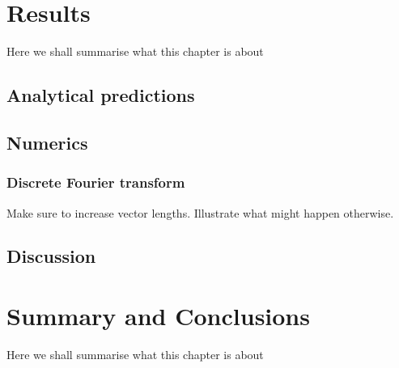 \documentclass[12pt]{report}
\newcommand{\todo}[1]{{\leavevmode\color{todo}#1}}
\begin{document}
\chapter{Results}
\todo{Here we shall summarise what this chapter is about}

\section{Analytical predictions}

\section{Numerics}

\subsection{Discrete Fourier transform}

\todo{Make sure to increase vector lengths. Illustrate what might happen otherwise.}

\section{Discussion}


\chapter{Summary and Conclusions}
\todo{Here we shall summarise what this chapter is about}





\end{document}
